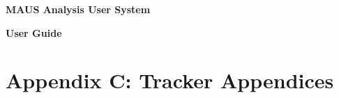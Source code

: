 \documentclass[a4paper, 10pt] {report}
\begin{document}
\vspace*{2.0cm}

\begin{center}
\Large{ \bf{MAUS Analysis User System} }

\Large{ \bf{User Guide} }
\end{center}

\tableofcontents

\newpage












%
%
%



% 




%



\chapter{Appendix C: Tracker Appendices}
\label{chapter:TrackerAppendices}

\end{document}
